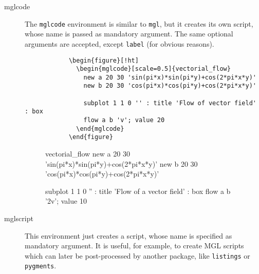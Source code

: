\documentclass{article}
\begin{document}
\begin{description}
		\item[mglcode] The \verb|mglcode| environment is similar to \verb|mgl|, but it creates its own script, whose name is passed as mandatory argument. The same optional arguments are accepted, except \verb|label| (for obvious reasons).
		\begin{verbatim}
			\begin{figure}[!ht]
			  \begin{mglcode}[scale=0.5]{vectorial_flow}
			    new a 20 30 'sin(pi*x)*sin(pi*y)+cos(2*pi*x*y)'
			    new b 20 30 'cos(pi*x)*cos(pi*y)+cos(2*pi*x*y)'
			    
			    subplot 1 1 0 '' : title 'Flow of vector field' : box
			    flow a b 'v'; value 20
			  \end{mglcode}
			\end{figure}
		\end{verbatim}
		\begin{figure}[!ht]
			\centering
			\begin{mglcode}[scale=0.5]{vectorial_flow}
				new a 20 30 'sin(pi*x)*sin(pi*y)+cos(2*pi*x*y)'
				new b 20 30 'cos(pi*x)*cos(pi*y)+cos(2*pi*x*y)'
				
				subplot 1 1 0 '' : title 'Flow of a vector field' : box
				flow a b '2v'; value 10
			\end{mglcode}
		\end{figure}
		
		\item[mglscript] This environment just creates a script, whose name is specified as mandatory argument. It is useful, for example, to create MGL scripts which can later be post-processed by another package, like \verb|listings| or \verb|pygments|.
		

\end{description}
\end{document}
